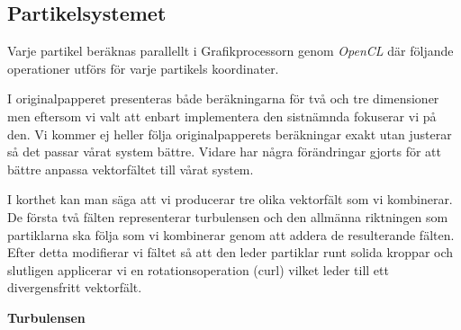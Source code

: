 \documentclass[a4paper]{article}
\begin{document}
\begin{multicols}{2}
    \vspace{-0.35cm}
    \subsection{Partikelsystemet} \label{sec:partikelsystemet}

    Varje partikel beräknas parallellt i Grafikprocessorn genom \textit{OpenCL} där följande operationer utförs för varje partikels koordinater.

    I originalpapperet presenteras både beräkningarna för två och tre dimensioner men eftersom vi valt att enbart implementera den sistnämnda fokuserar vi på den. Vi kommer ej heller följa originalpapperets beräkningar exakt utan justerar så det passar vårat system bättre. Vidare har några förändringar gjorts för att bättre anpassa vektorfältet till vårat system.

    I korthet kan man säga att vi producerar tre olika vektorfält som vi kombinerar. De första två fälten representerar turbulensen och den allmänna riktningen som partiklarna ska följa som vi kombinerar genom att addera de resulterande fälten. Efter detta modifierar vi fältet så att den leder partiklar runt solida kroppar och slutligen applicerar vi en rotationsoperation (curl) vilket leder till ett divergensfritt vektorfält.

    \textbf{Turbulensen}


\end{multicols}
\end{document}
